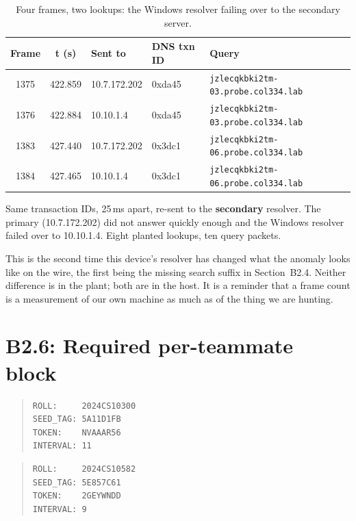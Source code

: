\begin{table}[H]
\centering
\caption{Four frames, two lookups: the Windows resolver failing over to the secondary server.}
\label{tab:b2failover}
\footnotesize
\begin{tabular}{@{}ccll>{\raggedright\arraybackslash}p{5.6cm}@{}}
\toprule
Frame & t (s) & Sent to & DNS txn ID & Query \\
\midrule
1375 & 422.859 & 10.7.172.202 & 0xda45 & \texttt{jzlecqkbki2tm-03.probe.col334.lab} \\
1376 & 422.884 & 10.10.1.4 & 0xda45 & \texttt{jzlecqkbki2tm-03.probe.col334.lab} \\
1383 & 427.440 & 10.7.172.202 & 0x3dc1 & \texttt{jzlecqkbki2tm-06.probe.col334.lab} \\
1384 & 427.465 & 10.10.1.4 & 0x3dc1 & \texttt{jzlecqkbki2tm-06.probe.col334.lab} \\
\bottomrule
\end{tabular}
\end{table}

Same transaction IDs, 25\,ms apart, re-sent to the \textbf{secondary} resolver. The primary
(10.7.172.202) did not answer quickly enough and the Windows resolver failed over to 10.10.1.4.
Eight planted lookups, ten query packets.

This is the second time this device's resolver has changed what the anomaly looks like on the
wire, the first being the missing search suffix in Section~B2.4. Neither difference is in the
plant; both are in the host. It is a reminder that a frame count is a measurement of our own
machine as much as of the thing we are hunting.

\section{B2.6: Required per-teammate block}

\begin{quote}\ttfamily\footnotesize
\begin{verbatim}
ROLL:     2024CS10300
SEED_TAG: 5A11D1FB
TOKEN:    NVAAAR56
INTERVAL: 11
\end{verbatim}
\end{quote}

\begin{quote}\ttfamily\footnotesize
\begin{verbatim}
ROLL:     2024CS10582
SEED_TAG: 5E857C61
TOKEN:    2GEYWNDD
INTERVAL: 9
\end{verbatim}
\end{quote}


